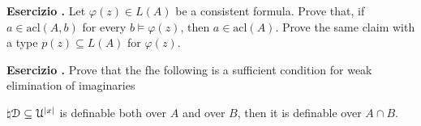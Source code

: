 \documentclass[10pt]{article}
\def\D{\EuScript D}
\def\U{\EuScript U}
\def\acl{\textrm{acl}}
\newcounter{ex}
\newenvironment{exercise}{\addtocounter{ex}{1}\textbf{Esercizio \theex.\quad}}{}
\begin{document}
\begin{exercise}
Let $\varphi(z)\in L(A)$ be a consistent formula.
Prove that, if $a\in\acl(A,b)$ for every $b\models\varphi(z)$, then $a\in\acl(A)$.
Prove the same claim with a type $p(z)\subseteq L(A)$ for $\varphi(z)$.
\end{exercise}


\begin{exercise}
Prove that the fhe following is a sufficient condition for weak elimination of imaginaries

$\natural$\qquad $\D\subseteq\U^{|x|}$ is definable both over $A$ and over $B$, then it is definable over $A\cap B$.
\end{exercise}
\end{document}
